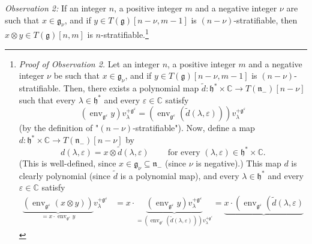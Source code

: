 \documentclass
[numbers=enddot,12pt,final,onecolumn,german,notitlepage]{scrartcl}%
\theoremstyle{definition}
\begin{document}
\textit{Observation 2:} If an integer $n$, a positive integer $m$ and a
negative integer $\nu$ are such that $x\in\mathfrak{g}_{\nu}$, and if $y\in
T\left(  \mathfrak{g}\right)  \left[  n-\nu,m-1\right]  $ is $\left(
n-\nu\right)  $-stratifiable, then $x\otimes y\in T\left(  \mathfrak{g}%
\right)  \left[  n,m\right]  $ is $n$-stratifiable.\footnote{\textit{Proof of
Observation 2.} Let an integer $n$, a positive integer $m$ and a negative
integer $\nu$ be such that $x\in\mathfrak{g}_{\nu}$, and if $y\in T\left(
\mathfrak{g}\right)  \left[  n-\nu,m-1\right]  $ is $\left(  n-\nu\right)
$-stratifiable. Then, there exists a polynomial map $\widetilde{d}%
:\mathfrak{h}^{\ast}\times\mathbb{C}\rightarrow T\left(  \mathfrak{n}%
_{-}\right)  \left[  n-\nu\right]  $ such that every $\lambda\in
\mathfrak{h}^{\ast}$ and every $\varepsilon\in\mathbb{C}$ satisfy%
\[
\left(  \operatorname*{env}\nolimits_{\mathfrak{g}^{\varepsilon}}y\right)
v_{\lambda}^{+\mathfrak{g}^{\varepsilon}}=\left(  \operatorname*{env}%
\nolimits_{\mathfrak{g}^{\varepsilon}}\left(  \widetilde{d}\left(
\lambda,\varepsilon\right)  \right)  \right)  v_{\lambda}^{+\mathfrak{g}%
^{\varepsilon}}%
\]
(by the definition of "$\left(  n-\nu\right)  $-stratifiable"). Now, define a
map $d:\mathfrak{h}^{\ast}\times\mathbb{C}\rightarrow T\left(  \mathfrak{n}%
_{-}\right)  \left[  n-\nu\right]  $ by
\[
d\left(  \lambda,\varepsilon\right)  =x\otimes\widetilde{d}\left(
\lambda,\varepsilon\right)  \ \ \ \ \ \ \ \ \ \ \text{for every }\left(
\lambda,\varepsilon\right)  \in\mathfrak{h}^{\ast}\times\mathbb{C}.
\]
(This is well-defined, since $x\in\mathfrak{g}_{\nu}\subseteq\mathfrak{n}_{-}$
(since $\nu$ is negative).) This map $d$ is clearly polynomial (since
$\widetilde{d}$ is a polynomial map), and every $\lambda\in\mathfrak{h}^{\ast
}$ and every $\varepsilon\in\mathbb{C}$ satisfy%
\begin{align*}
\underbrace{\left(  \operatorname*{env}\nolimits_{\mathfrak{g}^{\varepsilon}%
}\left(  x\otimes y\right)  \right)  }_{=x\cdot\operatorname*{env}%
\nolimits_{\mathfrak{g}^{\varepsilon}}y}v_{\lambda}^{+\mathfrak{g}%
^{\varepsilon}}  &  =x\cdot\underbrace{\left(  \operatorname*{env}%
\nolimits_{\mathfrak{g}^{\varepsilon}}y\right)  v_{\lambda}^{+\mathfrak{g}%
^{\varepsilon}}}_{=\left(  \operatorname*{env}\nolimits_{\mathfrak{g}%
^{\varepsilon}}\left(  \widetilde{d}\left(  \lambda,\varepsilon\right)
\right)  \right)  v_{\lambda}^{+\mathfrak{g}^{\varepsilon}}}%
=\underbrace{x\cdot\left(  \operatorname*{env}\nolimits_{\mathfrak{g}%
^{\varepsilon}}\left(  \widetilde{d}\left(  \lambda,\varepsilon\right)
}
\end{align*}}
\end{document}
